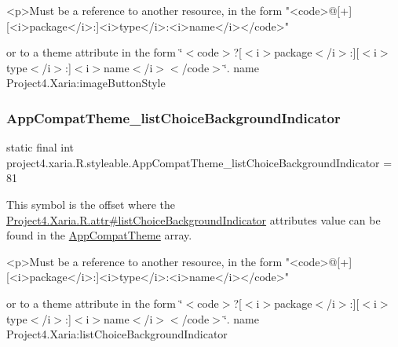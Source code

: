 \begin{DoxyVerb}      <p>Must be a reference to another resource, in the form "<code>@[+][<i>package</i>:]<i>type</i>:<i>name</i></code>"
\end{DoxyVerb}
 or to a theme attribute in the form \char`\"{}$<$code$>$?\mbox{[}$<$i$>$package$<$/i$>$\+:\mbox{]}\mbox{[}$<$i$>$type$<$/i$>$\+:\mbox{]}$<$i$>$name$<$/i$>$$<$/code$>$\char`\"{}.  name Project4.\+Xaria\+:image\+Button\+Style \mbox{\label{classproject4_1_1xaria_1_1R_1_1styleable_a3c9ed2db305731d7023349657b57ffe2}} 
\subsubsection{\texorpdfstring{App\+Compat\+Theme\+\_\+list\+Choice\+Background\+Indicator}{AppCompatTheme\_listChoiceBackgroundIndicator}}
{\footnotesize\ttfamily static final int project4.\+xaria.\+R.\+styleable.\+App\+Compat\+Theme\+\_\+list\+Choice\+Background\+Indicator = 81\hspace{0.3cm}{\ttfamily [static]}}

This symbol is the offset where the \hyperlink{}{Project4.\+Xaria.\+R.\+attr\#list\+Choice\+Background\+Indicator} attribute\textquotesingle{}s value can be found in the \hyperlink{classproject4_1_1xaria_1_1R_1_1styleable_aad8bec413e2350f9404e6ff0e831a85d}{App\+Compat\+Theme} array.

\begin{DoxyVerb}      <p>Must be a reference to another resource, in the form "<code>@[+][<i>package</i>:]<i>type</i>:<i>name</i></code>"
\end{DoxyVerb}
 or to a theme attribute in the form \char`\"{}$<$code$>$?\mbox{[}$<$i$>$package$<$/i$>$\+:\mbox{]}\mbox{[}$<$i$>$type$<$/i$>$\+:\mbox{]}$<$i$>$name$<$/i$>$$<$/code$>$\char`\"{}.  name Project4.\+Xaria\+:list\+Choice\+Background\+Indicator \mbox{\label{classproject4_1_1xaria_1_1R_1_1styleable_a736eb873329f632a3c8ce494223c9a1b}} 
